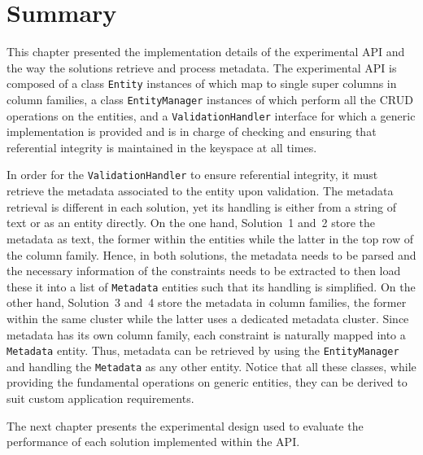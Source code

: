  
	


% 
% 
% 
% 
%  
% 
%   

\section{Summary}\label{s:Implementation-summary}

This chapter presented the implementation details of the experimental \ac{API}
and the way the solutions retrieve and process metadata. The experimental
\ac{API} is composed of a class \texttt{Entity}  instances of which map to
single super columns in column families,  a class \texttt{EntityManager} 
instances of which perform all the \ac{CRUD} operations on the entities, and a  
\texttt{ValidationHandler} interface for which a generic implementation is
provided and is in charge of checking and ensuring that referential integrity is
maintained in the keyspace at all times.  

In order for the \texttt{ValidationHandler} to ensure referential integrity, it
must retrieve the metadata associated to the entity upon validation. The
metadata retrieval is different in each solution, yet its handling is either
from a string of text or as an entity directly. On the one hand, Solution~1
and~2 store the metadata as text, the former  within the entities while the latter in the top
row of the column family. Hence, in both solutions, the
metadata needs to be parsed and the  necessary information  of 
the constraints needs to be extracted to then load these it into
a list of \texttt{Metadata} entities such that its handling is simplified. On
the other hand, Solution~3 and~4 store the metadata in column families, the
former within the same cluster while the latter uses a dedicated metadata
 cluster. Since metadata has its own column family, each constraint is naturally
 mapped into a \texttt{Metadata} entity. Thus, metadata can be   retrieved by
 using the \texttt{EntityManager} and handling the \texttt{Metadata} as any
other entity. Notice that all these classes, while providing the
 fundamental operations on generic entities, they can be derived to suit custom
application requirements.
   

The next chapter presents the experimental design used to evaluate  the
performance of each solution implemented within the \ac{API}.

